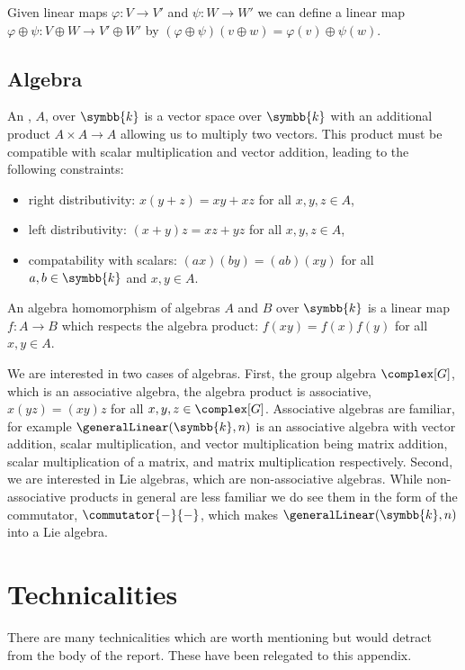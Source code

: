 \documentclass[fleqn]{NotesClass}
\renewcommand{\field}{\symbb{k}}
\begin{document}
\begin{appendices}
        Given linear maps \(\varphi \colon V \to V'\) and \(\psi \colon W \to W'\) we can define a linear map \(\varphi \oplus \psi \colon V \oplus W \to V' \oplus W'\) by \((\varphi \oplus \psi)(v \oplus w) = \varphi(v) \oplus \psi(w)\).
        
        \section{Algebra}\label{sec:algebras}
        An , \(A\), over \(\field\) is a vector space over \(\field\) with an additional product \(A \times A \to A\) allowing us to multiply two vectors.
        This product must be compatible with scalar multiplication and vector addition, leading to the following constraints:
        \begin{itemize}
            \item right distributivity: \(x(y + z) = xy + xz\) for all \(x, y, z \in A\),
            \item left distributivity: \((x + y)z = xz + yz\) for all \(x, y, z \in A\),
            \item compatability with scalars: \((ax)(by) = (ab)(xy)\) for all \(a, b \in \field\) and \(x, y \in A\).
        \end{itemize}
        
        An algebra homomorphism of algebras \(A\) and \(B\) over \(\field\) is a linear map \(f \colon A \to B\) which respects the algebra product: \(f(xy) = f(x)f(y)\) for all \(x, y \in A\).
        
        We are interested in two cases of algebras.
        First, the group algebra \(\complex[G]\), which is an associative algebra, the algebra product is associative, \(x(yz) = (xy)z\) for all \(x, y, z \in \complex[G]\).
        Associative algebras are familiar, for example \(\generalLinear(\field, n)\) is an associative algebra with vector addition, scalar multiplication, and vector multiplication being matrix addition, scalar multiplication of a matrix, and matrix multiplication respectively.
        Second, we are interested in Lie algebras, which are non-associative algebras.
        While non-associative products in general are less familiar we do see them in the form of the commutator, \(\commutator{-}{-}\), which makes \(\generalLinear(\field, n)\) into a Lie algebra.
        
        \chapter{Technicalities}
        There are many technicalities which are worth mentioning but would detract from the body of the report.
        These have been relegated to this appendix.
        

\end{appendices}
\end{document}
